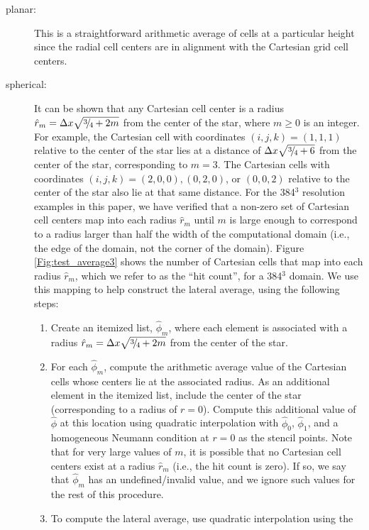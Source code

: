 \begin{description}
\item[planar:] 
  This is a straightforward arithmetic average of cells at a particular
  height since the radial cell centers are in alignment with the Cartesian 
  grid cell centers.
\item[spherical:] It can be shown that any Cartesian cell center is a
  radius $\hat r_m = \Delta x\sqrt{\sfrac{3}{4} + 2m}$ from the center of
  the star, where $m \ge 0$ is an integer.  
  For example, the Cartesian cell with coordinates $(i,j,k) = (1,1,1)$ relative
  to the center of the star lies at a distance of $\Delta x\sqrt{\sfrac{3}{4}+6}$
  from the center of the star, corresponding to $m=3$.  The Cartesian cells
  with coordinates $(i,j,k) = (2,0,0), (0,2,0)$, or $(0,0,2)$ relative to
  the center of the star also lie at that same 
  distance.  For the 384$^3$ resolution
  examples in this paper, we have verified that a non-zero set of
  Cartesian cell centers map into each radius $\hat r_m$ until $m$ is 
  large enough to correspond to a radius larger
  than half the width of the computational domain (i.e., the edge of the
  domain, not the corner of the domain).  Figure 
  \ref{Fig:test_average3} shows the number of Cartesian cells that map into each 
  radius $\hat r_m$, which we refer to as the ``hit count'', for a 384$^3$ domain.  
  We use this mapping to help construct the lateral average, using the following steps:
\begin{enumerate}
\item Create an itemized list, $\hat\phi_m$, where each element is
  associated with a radius $\hat r_m = \Delta x\sqrt{\sfrac{3}{4} + 2m}$ from the 
  center of the star.
\item For each $\hat\phi_m$, compute the arithmetic average value of the Cartesian 
  cells whose centers lie at the associated radius.  As an additional 
  element in the itemized list, include the center of the star (corresponding
  to a radius of $r=0$).  Compute this additional value of $\hat\phi$
  at this location using quadratic interpolation with $\hat\phi_0$, $\hat\phi_1$,
  and a homogeneous Neumann condition at $r=0$ as the stencil points.  Note
  that for very large values of $m$, it is possible that no Cartesian cell centers
  exist at a radius $\hat r_m$ (i.e., the hit count is zero).  
  If so, we say that $\hat\phi_m$ has an 
  undefined/invalid value, and we ignore such values for the rest of this procedure.
\item To compute the lateral average, use quadratic interpolation using the 

\end{enumerate}
\end{description}
